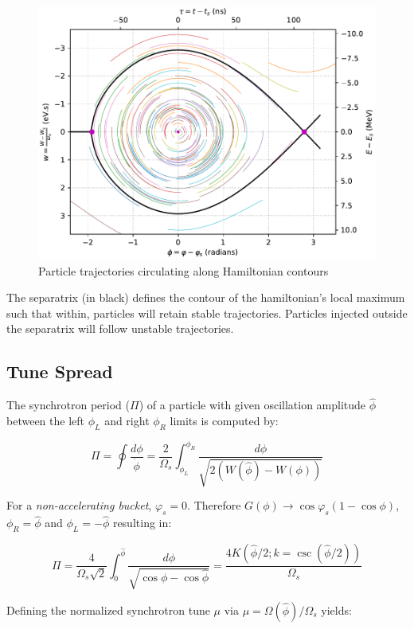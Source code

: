 \begin{figure}
    \centering
    \includegraphics{figs/single_particle_motion/trajectories.pdf}
    \caption{Particle trajectories circulating along Hamiltonian contours}
    \label{fig:fisheye}
\end{figure}

The separatrix (in black) defines the contour of the hamiltonian's local maximum such that within, particles will retain stable trajectories. Particles injected outside the separatrix will follow unstable trajectories.

\subsection{Tune Spread}

The synchrotron period  ($\Pi$) of a particle with given oscillation amplitude $\hat{\phi}$ between the left $\phi_L$ and right $\phi_R$ limits is computed by:

$$\Pi = \oint \frac{d\phi}{\dot{\phi}} = \frac{2}{\Omega_s}\int_{\phi_L}^{\phi_R} \frac{d\phi}{\sqrt{2(W(\hat{\phi})-W(\phi))}}$$

For a \textit{non-accelerating bucket}, $\varphi_s = 0$. Therefore $G(\phi) \to \cos\varphi_s(1-\cos\phi)$, $\phi_R = \hat{\phi}$ and $\phi_L = -\hat{\phi}$ resulting in:

$$\Pi = \frac{4}{\Omega_s\sqrt{2}}\int_0^{\hat{\phi}}\frac{d\phi}{\sqrt{\cos\phi-\cos\hat{\phi}}} = \frac{4K(\hat{\phi}/2; k=\csc(\hat{\phi}/2))}{\Omega_s}$$

Defining the normalized synchrotron tune $\mu$ via $\mu = \Omega(\hat{\phi})/\Omega_s$ yields:

